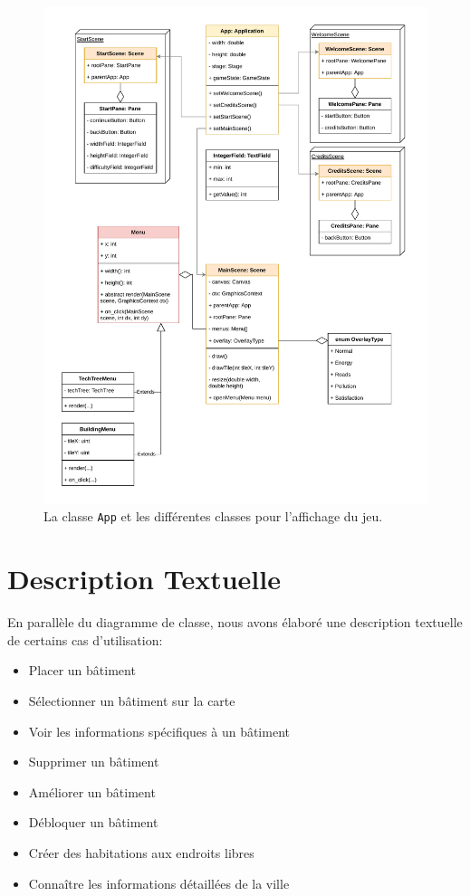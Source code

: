 \documentclass[12pt]{article}
\begin{document}
\begin{figure}[H]
\includegraphics[width=\textwidth]{uml-classes-Page-6}
\caption{La classe \texttt{App} et les différentes classes pour l'affichage du jeu.\label{fig:application}}
\end{figure}

\section{Description Textuelle}

En parallèle du diagramme de classe, nous avons élaboré une description textuelle de certains cas d'utilisation:

\begin{itemize}
    \item Placer un bâtiment
    \item Sélectionner un bâtiment sur la carte
    \item Voir les informations spécifiques à un bâtiment
    \item Supprimer un bâtiment
    \item Améliorer un bâtiment
    \item Débloquer un bâtiment
    \item Créer des habitations aux endroits libres
    \item Connaître les informations détaillées de la ville
\end{itemize}
\end{document}
